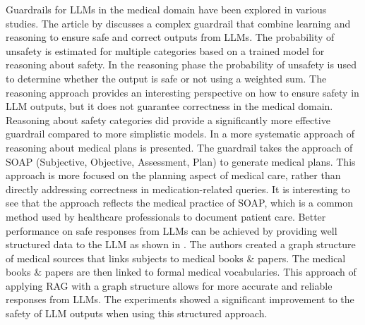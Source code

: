 %

Guardrails for LLMs in the medical domain have been explored in various studies.
The article by \citep{kang2024r} discusses a complex guardrail that combine learning and reasoning to ensure safe and correct outputs from LLMs.
The probability of unsafety is estimated for multiple categories based on a trained model for reasoning about safety.
In the reasoning phase the probability of unsafety is used to determine whether the output is safe or not using a weighted sum.
The reasoning approach provides an interesting perspective on how to ensure safety in LLM outputs, but it does not guarantee correctness in the medical domain.
Reasoning about safety categories did provide a significantly more effective guardrail compared to more simplistic models.
In \citep{hsu2025medplan} a more systematic approach of reasoning about medical plans is presented.
The guardrail takes the approach of SOAP (Subjective, Objective, Assessment, Plan) to generate medical plans.
This approach is more focused on the planning aspect of medical care, rather than directly addressing correctness in medication-related queries.
It is interesting to see that the approach reflects the medical practice of SOAP, which is a common method used by healthcare professionals to document patient care.
Better performance on safe responses from LLMs can be achieved by providing well structured data to the LLM as shown in \citep{wu2024medical}.
The authors created a graph structure of medical sources that links subjects to medical books \& papers.
The medical books \& papers are then linked to formal medical vocabularies.
This approach of applying RAG with a graph structure allows for more accurate and reliable responses from LLMs.
The experiments showed a significant improvement to the safety of LLM outputs when using this structured approach.